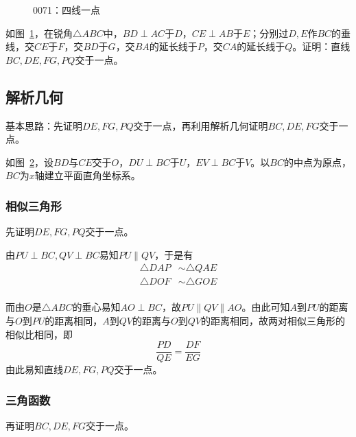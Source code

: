 

\begin{figure}[htbp]
  \centering
  \caption{0071：四线一点} \label{fig:0071}
\end{figure}

如图~\ref{fig:0071}，在锐角$\triangle ABC$中，$BD \perp AC$于$D$，$CE \perp AB$于$E$；分别过$D, E$作$BC$的垂线，交$CE$于$F$，交$BD$于$G$，交$BA$的延长线于$P$，交$CA$的延长线于$Q$。证明：直线$BC, DE, FG, PQ$交于一点。

\subsection{解析几何} \label{subsec:0071-dec}

基本思路：先证明$DE, FG, PQ$交于一点，再利用解析几何证明$BC, DE, FG$交于一点。

\begin{figure}[htbp]
  \centering
  \caption{} \label{fig:0071-dec}
\end{figure}

如图~\ref{fig:0071-dec}，设$BD$与$CE$交于$O$，$DU \perp BC$于$U$，$EV \perp BC$于$V$。以$BC$的中点为原点，$BC$为$x$轴建立平面直角坐标系。

\subsubsection{相似三角形}

先证明$DE, FG, PQ$交于一点。

由$PU \perp BC, QV \perp BC$易知$PU \parallel QV$，于是有
\begin{align*}
  \triangle DAP &\sim \triangle QAE \\
  \triangle DOF &\sim \triangle GOE \\
\end{align*}

而由$O$是$\triangle ABC$的垂心易知$AO \perp BC$，故$PU \parallel QV \parallel AO$。由此可知$A$到$PU$的距离与$O$到$PU$的距离相同，$A$到$QV$的距离与$O$到$QV$的距离相同，故两对相似三角形的相似比相同，即
\[ \frac{PD}{QE} = \frac{DF}{EG} \]
由此易知直线$DE, FG, PQ$交于一点。

\subsubsection{三角函数}

再证明$BC, DE, FG$交于一点。

